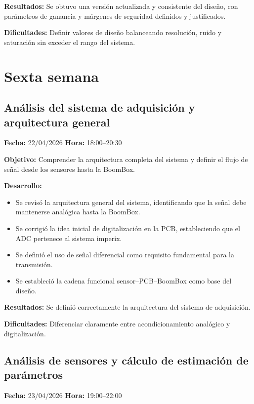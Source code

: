 \documentclass[12pt]{article}
\begin{document}

\textbf{Resultados:}
Se obtuvo una versión actualizada y consistente del diseño, con parámetros de ganancia y márgenes de seguridad definidos y justificados.

\textbf{Dificultades:}
Definir valores de diseño balanceando resolución, ruido y saturación sin exceder el rango del sistema.

\section{Sexta semana}

\subsection{Análisis del sistema de adquisición y arquitectura general}
\textbf{Fecha:} 22/04/2026 \quad \textbf{Hora:} 18:00--20:30

\textbf{Objetivo:}
Comprender la arquitectura completa del sistema y definir el flujo de señal desde los sensores hasta la BoomBox.

\textbf{Desarrollo:}
\begin{itemize}
\item Se revisó la arquitectura general del sistema, identificando que la señal debe mantenerse analógica hasta la BoomBox.
\item Se corrigió la idea inicial de digitalización en la PCB, estableciendo que el ADC pertenece al sistema imperix.
\item Se definió el uso de señal diferencial como requisito fundamental para la transmisión.
\item Se estableció la cadena funcional sensor--PCB--BoomBox como base del diseño.
\end{itemize}

\textbf{Resultados:}
Se definió correctamente la arquitectura del sistema de adquisición.

\textbf{Dificultades:}
Diferenciar claramente entre acondicionamiento analógico y digitalización.

\subsection{Análisis de sensores y cálculo de estimación de parámetros }
\textbf{Fecha:} 23/04/2026 \quad \textbf{Hora:} 19:00--22:00
\end{document}
